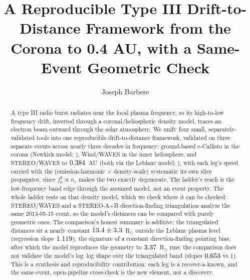 \documentclass[twocolumn]{aastex631}
\begin{document}
\title{A Reproducible Type III Drift-to-Distance Framework from the Corona to 0.4 AU,
with a Same-Event Geometric Check}

\author[0009-0008-3289-4447]{Joseph Barbere}

\begin{abstract}
A type III radio burst radiates near the local plasma frequency, so its high-to-low frequency drift,
inverted through a coronal/heliospheric density model, traces an electron beam outward through the
solar atmosphere. We unify four small, separately-validated tools into one reproducible
drift-to-distance framework, validated on three separate events across nearly three decades in
frequency: ground-based e-Callisto \citep{benz2009} in the corona (Newkirk model;
\citealt{newkirk1961}), Wind/WAVES \citep{bougeret1995} in the inner heliosphere, and
STEREO/WAVES \citep{bougeret2008} to $0.384$~AU (both via the Leblanc model;
\citealt{leblanc1998}), with each leg's speed carried with the (emission-harmonic
$\times$ density-scale) systematic its own slice propagates, since $f_p^2\propto n_e$ makes the
two exactly degenerate. The ladder's reach is the low-frequency band edge through the assumed
model, not an event property. The whole ladder rests on that density model, which we check where
it can be checked: STEREO/WAVES and a STEREO-A$+$B direction-finding triangulation
\citep{cecconi2008,krupar2012} analyse the same 2013-05-15 event, so the model's distances can
be compared with purely geometric ones. The comparison's honest summary is additive: the
triangulated distances sit a nearly constant $13.4\pm3.3$~R$_\odot$
outside the Leblanc plasma level (regression slope $1.119$), the signature of a
constant direction-finding pointing bias, after which the model reproduces the geometry to
$3.37$~R$_\odot$ rms; the comparison does not validate the model's log--log shape
over the triangulated band (slopes $0.653$ vs 1). This is a synthesis and
reproducibility contribution: each leg is a recover-a-known, and the same-event, open-pipeline
cross-check is the new element, not a discovery.
\end{abstract}

\end{document}
